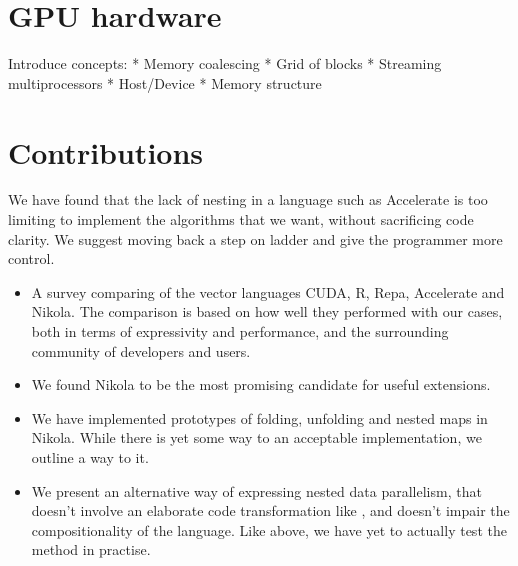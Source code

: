 \section{GPU hardware}
Introduce concepts:
 * Memory coalescing
 * Grid of blocks
 * Streaming multiprocessors
 * Host/Device
 * Memory structure

\section{Contributions}


We have found that the lack of nesting in a language such as
Accelerate is too limiting to implement the algorithms that we want,
without sacrificing code clarity. We suggest moving back a step on
ladder and give the programmer more control.



\begin{itemize}

\item A survey comparing of the vector languages CUDA, R, Repa, Accelerate and
  Nikola. The comparison is based on how well they performed with our cases,
  both in terms of expressivity and performance, and the surrounding community
  of developers and users.

\item We found Nikola to be the most promising candidate for useful extensions.

\item We have implemented prototypes of folding, unfolding and nested maps in
  Nikola. While there is yet some way to an acceptable implementation, we
  outline a way to it.

\item We present an alternative way of expressing nested data parallelism, that
  doesn't involve an elaborate code transformation like \cite{nesl}, and
  doesn't impair the compositionality of the language. Like above, we have yet
  to actually test the method in practise.

\end{itemize}

